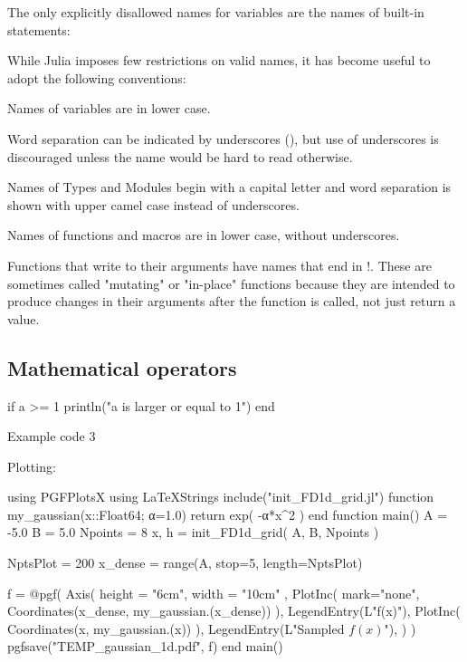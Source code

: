 The only explicitly disallowed names for variables are the names of built-in statements:

While Julia imposes few restrictions on valid names, it has become useful to adopt the following conventions:

Names of variables are in lower case.

Word separation can be indicated by underscores (), but use of underscores is discouraged unless the name would be hard to read otherwise.

Names of Types and Modules begin with a capital letter and word separation is shown with upper camel case instead of underscores.

Names of functions and macros are in lower case, without underscores.

Functions that write to their arguments have names that end in !. These are sometimes called "mutating" or "in-place" functions because they are intended to produce changes in their arguments after the function is called, not just return a value.


\subsection{Mathematical operators}

\begin{juliacode}
if a >= 1
  println("a is larger or equal to 1")
end
\end{juliacode}

Example code 3

Plotting:
\begin{juliacode}
using PGFPlotsX
using LaTeXStrings
include("init_FD1d_grid.jl")
function my_gaussian(x::Float64; α=1.0)
  return exp( -α*x^2 )
end
function main()
  A = -5.0
  B =  5.0
  Npoints = 8
  x, h = init_FD1d_grid( A, B, Npoints )

  NptsPlot = 200
  x_dense = range(A, stop=5, length=NptsPlot)

  f = @pgf(
    Axis( {height = "6cm", width = "10cm" },
      PlotInc( {mark="none"}, Coordinates(x_dense, my_gaussian.(x_dense)) ),
      LegendEntry(L"f(x)"),
      PlotInc( Coordinates(x, my_gaussian.(x)) ),
      LegendEntry(L"Sampled $f(x)$"),
    )
  )
  pgfsave("TEMP_gaussian_1d.pdf", f)
end
main()
\end{juliacode}
